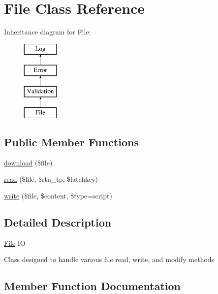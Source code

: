 \hypertarget{class_w_a_f_f_l_e_1_1_framework_1_1_i_o_1_1_file}{}\section{File Class Reference}
\label{class_w_a_f_f_l_e_1_1_framework_1_1_i_o_1_1_file}
Inheritance diagram for File\+:\begin{figure}[H]
\begin{center}
\leavevmode
\includegraphics[height=4.000000cm]{class_w_a_f_f_l_e_1_1_framework_1_1_i_o_1_1_file}
\end{center}
\end{figure}
\subsection*{Public Member Functions}
\begin{DoxyCompactItemize}
\item 
\hyperlink{class_w_a_f_f_l_e_1_1_framework_1_1_i_o_1_1_file_aafe286d7c8fb46b17af96b66734393c0}{download} (\$file)
\item 
\hyperlink{class_w_a_f_f_l_e_1_1_framework_1_1_i_o_1_1_file_abe1b4778c16b961777ab1aa25474995d}{read} (\$file, \$rtn\+\_\+tp, \$latchkey)
\item 
\hyperlink{class_w_a_f_f_l_e_1_1_framework_1_1_i_o_1_1_file_ad1346b1a0af3c4b9a5ced25b88e8f4ab}{write} (\$file, \$content, \$type=\textquotesingle{}script\textquotesingle{})
\end{DoxyCompactItemize}


\subsection{Detailed Description}
\hyperlink{class_w_a_f_f_l_e_1_1_framework_1_1_i_o_1_1_file}{File} IO

Class designed to handle various file read, write, and modify methods 

\subsection{Member Function Documentation}
\mbox{\label{class_w_a_f_f_l_e_1_1_framework_1_1_i_o_1_1_file_aafe286d7c8fb46b17af96b66734393c0}} 
